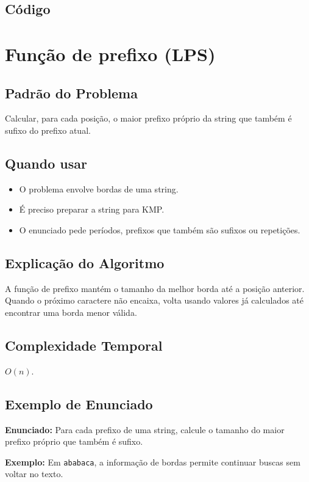 \subsection{Código}

\section{Função de prefixo (LPS)}

\subsection{Padrão do Problema}
Calcular, para cada posição, o maior prefixo próprio da string que também é sufixo do prefixo atual.

\subsection{Quando usar}
\begin{itemize}[nosep]
  \item O problema envolve bordas de uma string.
  \item É preciso preparar a string para KMP.
  \item O enunciado pede períodos, prefixos que também são sufixos ou repetições.
\end{itemize}

\subsection{Explicação do Algoritmo}
A função de prefixo mantém o tamanho da melhor borda até a posição anterior. Quando o próximo caractere não encaixa, volta usando valores já calculados até encontrar uma borda menor válida.

\subsection{Complexidade Temporal}
$O(n)$.

\subsection{Exemplo de Enunciado}
\begin{exemplodiabox}
\textbf{Enunciado:} Para cada prefixo de uma string, calcule o tamanho do maior prefixo próprio que também é sufixo.

\textbf{Exemplo:} Em \texttt{ababaca}, a informação de bordas permite continuar buscas sem voltar no texto.
\end{exemplodiabox}


